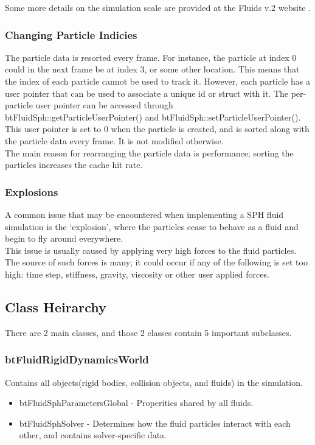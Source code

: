 \documentclass[]{article}
\begin{document}
			Some more details on the simulation scale are provided at the Fluids v.2 website \cite{RH:2008}.
			
		\subsubsection{Changing Particle Indicies}
			The particle data is resorted every frame. For instance, the particle at index 0 could in the next frame be
			at index 3, or some other location. This means that the index of each particle cannot be used to track it. 
			However, each particle has a user pointer that can be used to associate a unique id or struct with it. The 
			per-particle user pointer can be accessed through btFluidSph::getParticleUserPointer() and 
			btFluidSph::setParticleUserPointer(). This user pointer is set to 0 when the particle is created, and is 
			sorted along with the particle data every frame. It is not modified otherwise.\\
			
			The main reason for rearranging the particle data is performance; sorting the particles increases the cache 
			hit rate.
		
		\subsubsection{Explosions}
			A common issue that may be encountered when implementing a SPH fluid simulation is the `explosion', where 
			the particles cease to behave as a fluid and begin to fly around everywhere.\\
			
			This issue is usually caused by applying very high forces to the fluid particles. The source of such forces 
			is many; it could occur if any of the following is set too high: time step, stiffness, gravity, viscosity 
			or other user applied forces.
	
	\subsection{Class Heirarchy}
		There are 2 main classes, and those 2 classes contain 5 important subclasses.
	
		\subsubsection{btFluidRigidDynamicsWorld}
			Contains all objects(rigid bodies, collision objects, and fluids) in the simulation.
			\begin{itemize}
				\item btFluidSphParametersGlobal - Properities shared by all fluids.
				\item btFluidSphSolver - Determines how the fluid particles interact with each other, and contains solver-specific data.
			\end{itemize}
			
\end{document}

